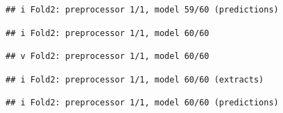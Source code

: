 \documentclass[
]{article}
\begin{document}
\begin{verbatim}
## i Fold2: preprocessor 1/1, model 59/60 (predictions)
\end{verbatim}

\begin{verbatim}
## i Fold2: preprocessor 1/1, model 60/60
\end{verbatim}

\begin{verbatim}
## v Fold2: preprocessor 1/1, model 60/60
\end{verbatim}

\begin{verbatim}
## i Fold2: preprocessor 1/1, model 60/60 (extracts)
\end{verbatim}

\begin{verbatim}
## i Fold2: preprocessor 1/1, model 60/60 (predictions)
\end{verbatim}
\end{document}
